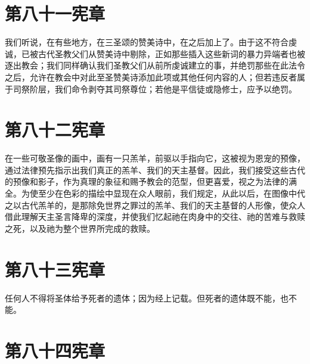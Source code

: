 
\section{第八十一宪章}

我们听说，在有些地方，在三圣颂的赞美诗中，在之后加上了。由于这不符合虔诚，已被古代圣教父们从赞美诗中剔除，正如那些插入这些新词的暴力异端者也被逐出教会；我们同样确认我们圣教父们从前所虔诚建立的事，并绝罚那些在此法令之后，允许在教会中对此至圣赞美诗添加此项或其他任何内容的人；但若违反者属于司祭阶层，我们命令剥夺其司祭尊位；若他是平信徒或隐修士，应予以绝罚。\par


\section{第八十二宪章}

在一些可敬圣像的画中，画有一只羔羊，前驱以手指向它，这被视为恩宠的预像，通过法律预先指示出我们真正的羔羊、我们的天主基督。因此，我们接受这些古代的预像和影子，作为真理的象征和赐予教会的范型，但更喜爱，视之为法律的满全。为使至少在色彩的描绘中显现在众人眼前，我们规定，从此以后，在图像中代之以古代羔羊的，是那除免世界之罪过的羔羊、我们的天主基督的人形像，使众人借此理解天主圣言降卑的深度，并使我们忆起祂在肉身中的交往、祂的苦难与救赎之死，以及祂为整个世界所完成的救赎。\par


\section{第八十三宪章}

任何人不得将圣体给予死者的遗体；因为经上记载。但死者的遗体既不能，也不能。\par


\section{第八十四宪章}

